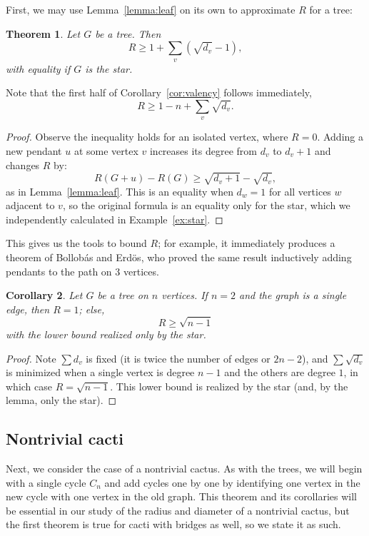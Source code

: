\documentclass{amsart}
\newtheorem{thm}{Theorem}[section]%
\newtheorem{cor}[thm]{Corollary}
\theoremstyle{definition}
\begin{document}
First, we may use Lemma~\ref{lemma:leaf} on its own to approximate $R$ for a tree:

\begin{thm}\label{thm:tree_osv}
Let $G$ be a tree. Then
\[R \geq 1+\sum_{v} \left(\sqrt{d_v}-1\right),\]
with equality if $G$ is the star. 
\end{thm}

Note that the first half of Corollary~\ref{cor:valency} follows immediately,
\[R \geq 1 - n + \sum_{v} \sqrt{d_v}.\]

\begin{proof}
Observe the inequality holds for an isolated vertex, where $R=0$. Adding a new pendant $u$ at some vertex $v$ increases its degree from $d_v$ to $d_v+1$ and changes $R$ by:
\[R(G + u) - R(G) \geq \sqrt{d_v+1}-\sqrt{d_v},\] 
as in Lemma~\ref{lemma:leaf}. This is an equality when $d_w = 1$ for all vertices $w$ adjacent to $v$, so the original formula is an equality only for the star, which we independently calculated in Example~\ref{ex:star}.
\end{proof}

This gives us the tools to bound $R$; for example, it immediately produces a theorem of Bollob\'as and Erd\"os, who proved the same result inductively adding pendants to the path on 3 vertices. 

\begin{cor}\cite[Theorem~3]{bollobas1998extremal}\label{cor:tree_extrema} Let $G$ be a tree on $n$ vertices. If $n=2$ and the graph is a single edge, then $R=1$; else,
\[R \geq \sqrt {n-1}\]
with the lower bound realized only by the star.
\end{cor}

\begin{proof}
Note $\sum d_v$ is fixed (it is twice the number of edges or $2n-2$), and $\sum \sqrt{d_v}$ is minimized when a single vertex is degree $n-1$ and the others are degree $1$, in which case $R = \sqrt{n-1}$. This lower bound is realized by the star (and, by the lemma, only the star).

\end{proof}


\subsection{Nontrivial cacti}

Next, we consider the case of a nontrivial cactus. As with the trees, we will begin with a single cycle $C_n$ and add cycles one by one by identifying one vertex in the new cycle with one vertex in the old graph. This theorem and its corollaries will be essential in our study of the radius and diameter of a nontrivial cactus, but the first theorem is true for cacti with bridges as well, so we state it as such.
\end{document}
